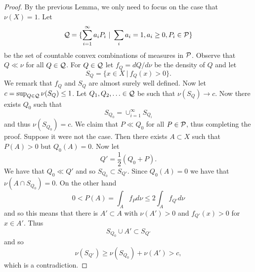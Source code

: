 \documentclass[twoside, a4paper, 10pt]{amsart}
\begin{document}
\begin{proof} By the previous Lemma, we only need to focus on the case that $\nu(X)=1$.  Let $$\mathcal{Q} = \{ \sum_{i=1}^{\infty} a_i P_i ~|~ \sum_{i} a_i = 1, a_i \geq 0, P_i \in \mathcal{P} \}$$ be the set of countable convex combinations of measures in $\mathcal{P}$. Observe that $Q \ll \nu$ for all $Q \in \mathcal{Q}$. For $Q \in \mathcal{Q}$ let $f_Q = dQ/d\nu$ be the density of $Q$ and let $$S_Q = \{ x \in X ~|~ f_Q(x)>0 \}.$$ We remark that $f_Q$ and $S_Q$ are almost surely well defined. Now let $c = \sup_{Q \in \mathcal{Q}} \nu(S_Q) \leq 1$. Let $Q_1,Q_2,\ldots \in \mathcal{Q}$ be such that $\nu(S_Q) \to c$. Now there exists $Q_0$ such that $$S_{Q_0} = \cup_{i=1}^{\infty} S_{Q_i}$$ and thus $\nu(S_{Q_0}) = c$. We claim that $P \ll Q_0$ for all $P \in \mathcal{P}$, thus completing the proof. Suppose it were not the case. Then there exists $A \subset X$ such that $P(A) >0$ but $Q_0(A)=0$. Now let $$Q' = \frac{1}{2}\left( Q_0 + P \right).$$ We have that $Q_0 \ll Q'$ and so $S_{Q_0} \subset S_{Q'}$. Since $Q_0(A)=0$ we have that $\nu(A \cap S_{Q_0}) = 0$. On the other hand $$0<P(A) = \int_{A} f_P d\nu \leq 2\int_A f_{Q'} d\nu$$ and so this means that there is $A' \subset A$ with $\nu(A')>0$ and $f_{Q'}(x) >0$ for $x \in A'$. Thus $$S_{Q_0} \cup A' \subset S_{Q'}$$ and so $$\nu(S_{Q'}) \geq \nu(S_{Q_0}) + \nu(A') > c,$$ which is a contradiction. \end{proof}
\end{document}
